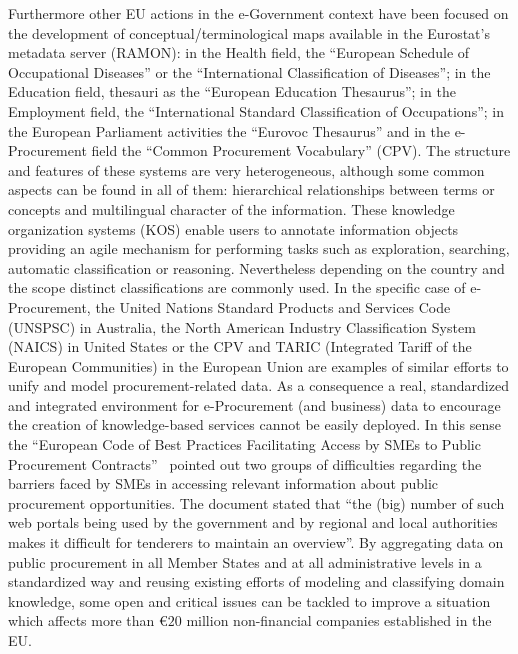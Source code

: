 Furthermore other EU actions in the e-Government context have been focused on the development of conceptual/terminological maps available in the Eurostat's metadata server (RAMON): 
in the Health field, the ``European Schedule of Occupational Diseases'' or  the ``International Classification of Diseases''; in the Education field,  
thesauri as the ``European Education Thesaurus''; in the Employment field, the ``International Standard Classification of Occupations''; 
in the European Parliament activities the ``Eurovoc Thesaurus'' and in the e-Procurement field the ``Common Procurement Vocabulary'' (CPV). 
The structure and features of these systems are very heterogeneous, although some common aspects can be found in all of them: hierarchical relationships between terms or concepts and multilingual character of the information. 
These knowledge organization systems (KOS) enable users to annotate information objects providing an agile mechanism for performing 
tasks such as exploration, searching, automatic classification or reasoning. Nevertheless depending on the country and the scope 
distinct classifications are commonly used. In the specific case of e-Procurement, the United Nations Standard Products and Services Code (UNSPSC) in Australia, 
the North American Industry Classification System (NAICS) in United States or the CPV and TARIC (Integrated Tariff of the European Communities) in the European Union 
are examples of similar efforts to unify and model procurement-related data. As a consequence a real, standardized and integrated environment 
for e-Procurement (and business) data to encourage the creation of knowledge-based services cannot be easily deployed. In this sense the 
``European Code of Best Practices Facilitating Access by SMEs to Public Procurement Contracts''~\cite{d2008} pointed out 
two groups of difficulties regarding the barriers faced by SMEs in accessing relevant information about public procurement opportunities. 
The document stated that ``the (big) number of such web portals being used by the government and by regional and local authorities makes it difficult 
for tenderers to maintain an overview''. By aggregating data on public procurement in all Member States 
and at all administrative levels in a standardized way and reusing existing efforts of modeling 
and classifying domain knowledge, some open and critical issues can be tackled to improve a situation which affects more 
than \euro $20$ million non-financial companies established in the EU.


